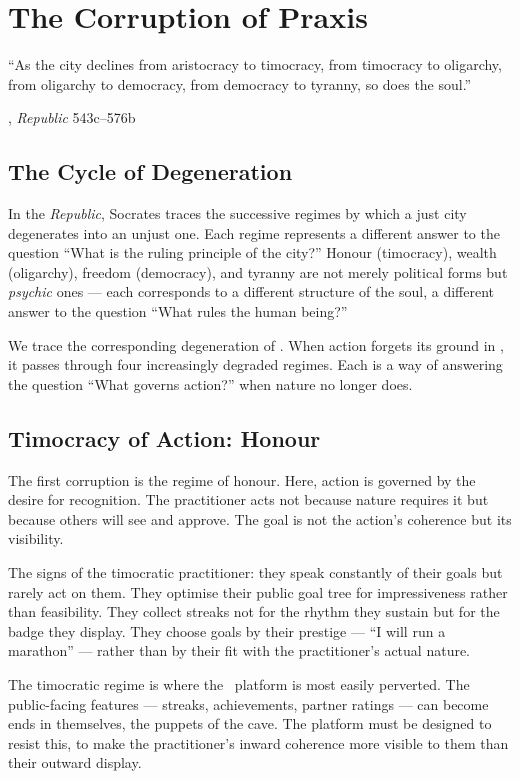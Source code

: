 \chapter{The Corruption of Praxis}

\epigraph{``As the city declines from aristocracy to timocracy, from timocracy to
oligarchy, from oligarchy to democracy, from democracy to tyranny, so does the
soul.''}{\textcite{plato1997complete}, \emph{Republic} 543c--576b}

\section{The Cycle of Degeneration}

In the \emph{Republic}, Socrates traces the successive regimes by which a just
city degenerates into an unjust one. Each regime represents a different answer
to the question ``What is the ruling principle of the city?'' Honour
(timocracy), wealth (oligarchy), freedom (democracy), and tyranny are not
merely political forms but \emph{psychic} ones --- each corresponds to a
different structure of the soul, a different answer to the question ``What rules
the human being?''

We trace the corresponding degeneration of \praxis. When action forgets its
ground in \physis, it passes through four increasingly degraded regimes. Each is
a way of answering the question ``What governs action?'' when nature no longer
does.

\section{Timocracy of Action: Honour}

The first corruption is the regime of honour. Here, action is governed by the
desire for recognition. The practitioner acts not because nature requires it but
because others will see and approve. The goal is not the action's coherence but
its visibility.

The signs of the timocratic practitioner: they speak constantly of their goals
but rarely act on them. They optimise their public goal tree for impressiveness
rather than feasibility. They collect streaks not for the rhythm they sustain
but for the badge they display. They choose goals by their prestige --- ``I
will run a marathon'' --- rather than by their fit with the practitioner's
actual nature.

The timocratic regime is where the \praxis\ platform is most easily perverted.
The public-facing features --- streaks, achievements, partner ratings --- can
become ends in themselves, the puppets of the cave. The platform must be
designed to resist this, to make the practitioner's inward coherence more
visible to them than their outward display.

